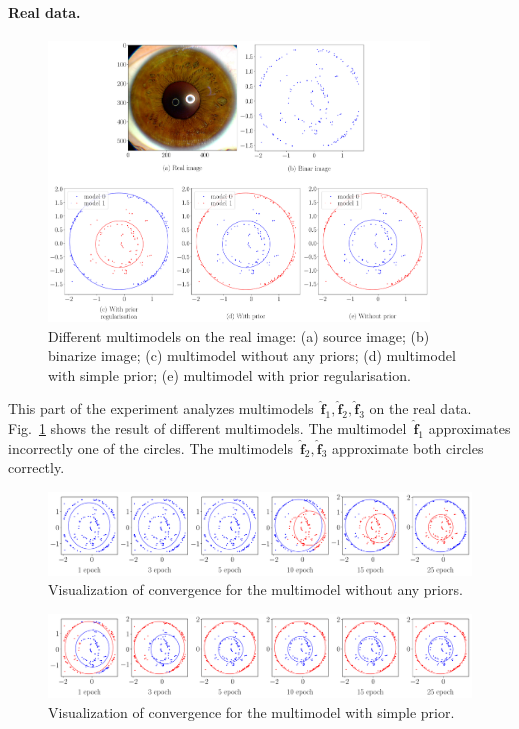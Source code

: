 \documentclass[12pt, twoside]{article}
\numberwithin{equation}{section}
\begin{document}
\paragraph{Real data.}
\begin{figure}[h!t]\center
\includegraphics[width=0.9\textwidth]{result_eng/experiment_real_compare}
\caption{Different multimodels on the real image: (a) source image; (b) binarize image; (c) multimodel without any priors; (d) multimodel with simple prior; (e) multimodel with prior regularisation.}
\label{experiment:2}
\end{figure}

This part of the experiment analyzes multimodels~$\hat{\mathbf{f}}_1, \hat{\mathbf{f}}_2, \hat{\mathbf{f}}_3$ on the real data.
Fig.~\ref{experiment:2} shows the result of different multimodels.
The multimodel~$\hat{\mathbf{f}}_1$ approximates incorrectly one of the circles.
The multimodels~$\hat{\mathbf{f}}_2, \hat{\mathbf{f}}_3$ approximate both circles correctly.

\begin{figure}[h!t]\center
\includegraphics[width=1\textwidth]{result_eng/experiment_real_not_prior}
\caption{Visualization of convergence for the multimodel without any priors.}
\label{experiment:3}
\end{figure}

\begin{figure}[h!t]\center
\includegraphics[width=1\textwidth]{result_eng/experiment_real_prior}
\caption{Visualization of convergence for the multimodel with simple prior.}
\label{experiment:4}
\end{figure}
\end{document}
